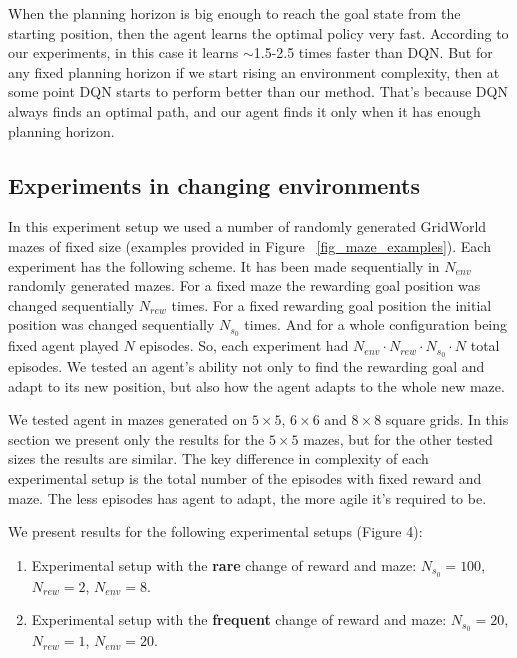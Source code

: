 \documentclass[a4paper,twoside]{article}
\begin{document}
When the planning horizon is big enough to reach the goal state from the starting position, then the agent learns the optimal policy very fast. According to our experiments, in this case it learns $\sim$1.5-2.5 times faster than DQN. But for any fixed planning horizon if we start rising an environment complexity, then at some point DQN starts to perform better than our method. That's because DQN always finds an optimal path, and our agent finds it only when it has enough planning horizon.

\subsection{Experiments in changing environments}

In this experiment setup we used a number of randomly generated GridWorld mazes of fixed size (examples provided in Figure ~\ref{fig_maze_examples}). Each experiment has the following scheme. It has been made sequentially in $N_{env}$ randomly generated mazes. For a fixed maze the rewarding goal position was changed sequentially $N_{rew}$ times. For a fixed rewarding goal position the initial position was changed sequentially $N_{s_0}$ times. And for a whole configuration being fixed agent played $N$ episodes. So, each experiment had $N_{env} \cdot N_{rew} \cdot N_{s_0} \cdot N$ total episodes. We tested an agent's ability not only to find the rewarding goal and adapt to its new position, but also how the agent adapts to the whole new maze.

We tested agent in mazes generated on $5 \times 5$, $6 \times 6$ and $8 \times 8$ square grids. In this section we present only the results for the $5 \times 5$ mazes, but for the other tested sizes the results are similar. The key difference in complexity of each experimental setup is the total number of the episodes with fixed reward and maze. The less episodes has agent to adapt, the more agile it's required to be.

We present results for the following experimental setups (Figure 4):

\begin{enumerate}
  \item Experimental setup with the \textbf{rare} change of reward and maze: $N_{s_0} = 100$, $N_{rew} = 2$, $N_{env} = 8$.

  \item Experimental setup with the \textbf{frequent} change of reward and maze: $N_{s_0} = 20$, $N_{rew} = 1$, $N_{env} = 20$.
\end{enumerate}
\end{document}
